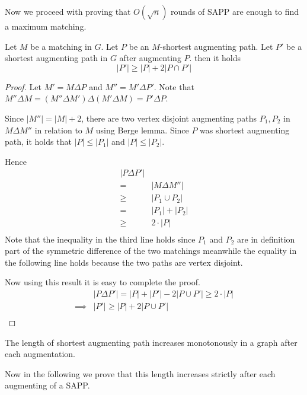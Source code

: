Now we proceed with proving that $O(\sqrt n)$ rounds of SAPP are enough to find a maximum matching.

\begin{lemma}
	Let $M$ be a matching in $G$. Let $P$ be an $M$-shortest augmenting path. Let $P'$ be a shortest augmenting path in $G$ after augmenting $P$. then it holds
	\[
		|P'| \geq |P| + 2 |P \cap P'|
	\]
\end{lemma}
\begin{proof}
	Let $M' = M \Delta P$ and $M'' = M' \Delta P'$. Note that $M'' \Delta M = (M'' \Delta M') \Delta (M' \Delta M) = P' \Delta P$.

	Since $|M''| = |M| + 2$, there are two vertex disjoint augmenting paths $P_1, P_2$ in $M \Delta M''$ in relation to $M$ using Berge lemma. Since $P$ was shortest augmenting path, it holds that $|P| \leq |P_1|$ and $|P| \leq |P_2|$.

	Hence
	\begin{align*}
		|P \Delta P'|&\\
		=& |M \Delta M''|\\
		\geq& |P_1 \cup P_2|\\
		=& |P_1| + |P_2|\\
		\geq& 2 \cdot |P|\\
	\end{align*}
	Note that the inequality in the third line holds since $P_1$ and $P_2$ are in definition part of the symmetric difference of the two matchings meanwhile the equality in the following line holds because the two paths are vertex disjoint.

	Now using this result it is easy to complete the proof.
	\begin{align*}
		&|P \Delta P'| = |P| + |P'| - 2 |P \cup P'| \geq 2 \cdot |P|\\
		\implies&|P'| \geq |P| + 2|P \cup P'|\\
	\end{align*}
\end{proof}


\begin{corollary}
	The length of shortest augmenting path increases monotonously in a graph after each augmentation.
\end{corollary}

Now in the following we prove that this length increases strictly after each augmenting of a SAPP.

